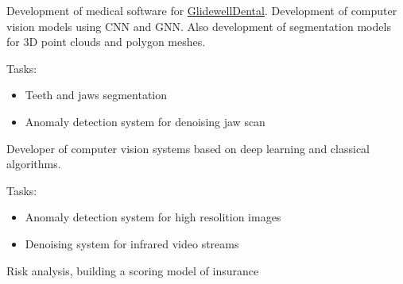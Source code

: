 
Development of medical software for \href{https://glidewelldental.com/}{GlidewellDental}. Development of computer vision models using CNN and GNN. Also development of segmentation models for 3D point clouds and polygon meshes.

Tasks:
\begin{itemize}
	\item Teeth and jaws segmentation
	\item Anomaly detection system for denoising jaw scan
\end{itemize}

\divider

Developer of computer vision systems based on deep learning and classical algorithms.

Tasks:
\begin{itemize}
	\item Anomaly detection system for high resolition images
	\item Denoising system for infrared video streams
\end{itemize}


\divider


Risk analysis, building a scoring model of insurance



